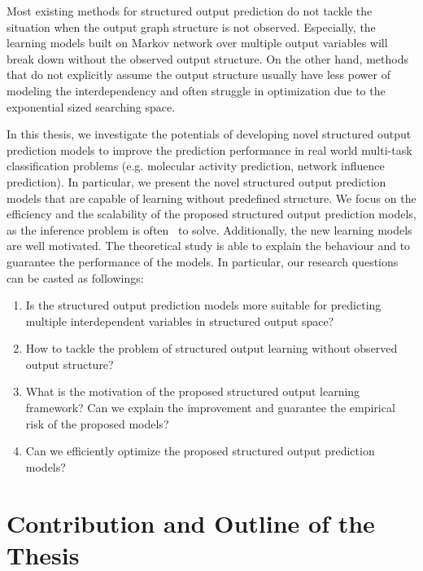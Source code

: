 Most existing methods for structured output prediction do not tackle the situation when the output graph structure is not observed.
Especially, the learning models built on Markov network over multiple output variables will break down without the observed output structure.
On the other hand, methods that do not explicitly assume the output structure usually have less power of modeling the interdependency and often struggle in optimization due to the exponential sized searching space.

In this thesis, we investigate the potentials of developing novel structured output prediction models to improve the prediction performance in real world multi-task classification problems (e.g. molecular activity prediction, network influence prediction).
In particular, we present the novel structured output prediction models that are capable of learning without predefined structure.
We focus on the efficiency and the scalability of the proposed structured output prediction models, as the inference problem is often \nphard\ to solve.
Additionally, the new learning models are well motivated.
The theoretical study is able to explain the behaviour and to guarantee the performance of the models.
In particular, our research questions can be casted as followings:
\begin{enumerate}[label=\textbf{Q \Roman*}:]
\item Is the structured output prediction models more suitable for predicting multiple interdependent variables in structured output space?
\item How to tackle the problem of structured output learning without observed output structure?
\item What is the motivation of the proposed structured output learning framework? Can we explain the improvement and guarantee the empirical risk of the proposed models?
\item Can we efficiently optimize the proposed structured output prediction models?
\end{enumerate}





\section{Contribution and Outline of the Thesis}

